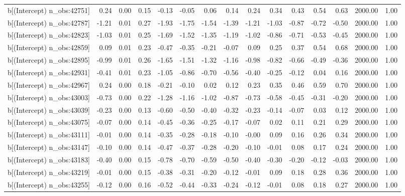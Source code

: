\begin{table}[ht]
\begin{tabular}{rrrrrrrrrrrrrrr}
  b[(Intercept) n\_obs:42751] & 0.24 & 0.00 & 0.15 & -0.13 & -0.05 & 0.06 & 0.14 & 0.24 & 0.34 & 0.43 & 0.54 & 0.63 & 2000.00 & 1.00 \\ 
  b[(Intercept) n\_obs:42787] & -1.21 & 0.01 & 0.27 & -1.93 & -1.75 & -1.54 & -1.39 & -1.21 & -1.03 & -0.87 & -0.72 & -0.50 & 2000.00 & 1.00 \\ 
  b[(Intercept) n\_obs:42823] & -1.03 & 0.01 & 0.25 & -1.69 & -1.52 & -1.35 & -1.19 & -1.02 & -0.86 & -0.71 & -0.53 & -0.45 & 2000.00 & 1.00 \\ 
  b[(Intercept) n\_obs:42859] & 0.09 & 0.01 & 0.23 & -0.47 & -0.35 & -0.21 & -0.07 & 0.09 & 0.25 & 0.37 & 0.54 & 0.68 & 2000.00 & 1.00 \\ 
  b[(Intercept) n\_obs:42895] & -0.99 & 0.01 & 0.26 & -1.65 & -1.51 & -1.32 & -1.16 & -0.98 & -0.82 & -0.66 & -0.49 & -0.36 & 2000.00 & 1.00 \\ 
  b[(Intercept) n\_obs:42931] & -0.41 & 0.01 & 0.23 & -1.05 & -0.86 & -0.70 & -0.56 & -0.40 & -0.25 & -0.12 & 0.04 & 0.16 & 2000.00 & 1.00 \\ 
  b[(Intercept) n\_obs:42967] & 0.24 & 0.00 & 0.18 & -0.21 & -0.10 & 0.02 & 0.12 & 0.23 & 0.35 & 0.46 & 0.59 & 0.70 & 2000.00 & 1.00 \\ 
  b[(Intercept) n\_obs:43003] & -0.73 & 0.00 & 0.22 & -1.28 & -1.16 & -1.02 & -0.87 & -0.73 & -0.58 & -0.45 & -0.31 & -0.20 & 2000.00 & 1.00 \\ 
  b[(Intercept) n\_obs:43039] & -0.23 & 0.00 & 0.13 & -0.60 & -0.50 & -0.40 & -0.32 & -0.23 & -0.14 & -0.07 & 0.03 & 0.12 & 2000.00 & 1.00 \\ 
  b[(Intercept) n\_obs:43075] & -0.07 & 0.00 & 0.14 & -0.45 & -0.36 & -0.25 & -0.17 & -0.07 & 0.02 & 0.11 & 0.21 & 0.29 & 2000.00 & 1.00 \\ 
  b[(Intercept) n\_obs:43111] & -0.01 & 0.00 & 0.14 & -0.35 & -0.28 & -0.18 & -0.10 & -0.00 & 0.09 & 0.16 & 0.26 & 0.34 & 2000.00 & 1.00 \\ 
  b[(Intercept) n\_obs:43147] & -0.10 & 0.00 & 0.14 & -0.47 & -0.37 & -0.28 & -0.20 & -0.10 & -0.01 & 0.08 & 0.17 & 0.24 & 2000.00 & 1.00 \\ 
  b[(Intercept) n\_obs:43183] & -0.40 & 0.00 & 0.15 & -0.78 & -0.70 & -0.59 & -0.50 & -0.40 & -0.30 & -0.20 & -0.12 & -0.03 & 2000.00 & 1.00 \\ 
  b[(Intercept) n\_obs:43219] & -0.01 & 0.00 & 0.15 & -0.38 & -0.31 & -0.20 & -0.12 & -0.01 & 0.09 & 0.18 & 0.28 & 0.36 & 2000.00 & 1.00 \\ 
  b[(Intercept) n\_obs:43255] & -0.12 & 0.00 & 0.16 & -0.52 & -0.44 & -0.33 & -0.24 & -0.12 & -0.01 & 0.08 & 0.18 & 0.27 & 2000.00 & 1.00 \\ 

\end{tabular}
\end{table}
